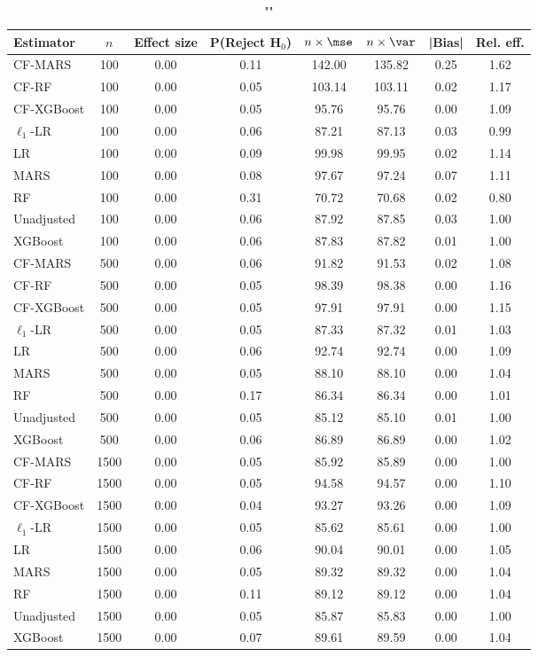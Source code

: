 \begin{table}
\centering
\caption{""}
\begin{tabular}{lccccccc}
\toprule
Estimator & $n$ & Effect size & P(Reject H$_0$) & $n\times\mse$ & $n\times \var$ & |Bias| & Rel. eff.\\ \midrule
CF-MARS & 100 & 0.00 & 0.11 & 142.00 & 135.82 & 0.25 & 1.62 \\ 
CF-RF & 100 & 0.00 & 0.05 & 103.14 & 103.11 & 0.02 & 1.17 \\ 
CF-XGBoost & 100 & 0.00 & 0.05 &  95.76 &  95.76 & 0.00 & 1.09 \\ 
$\ell_1$-LR & 100 & 0.00 & 0.06 &  87.21 &  87.13 & 0.03 & 0.99 \\ 
LR & 100 & 0.00 & 0.09 &  99.98 &  99.95 & 0.02 & 1.14 \\ 
MARS & 100 & 0.00 & 0.08 &  97.67 &  97.24 & 0.07 & 1.11 \\ 
RF & 100 & 0.00 & 0.31 &  70.72 &  70.68 & 0.02 & 0.80 \\ 
Unadjusted & 100 & 0.00 & 0.06 &  87.92 &  87.85 & 0.03 & 1.00 \\ 
XGBoost & 100 & 0.00 & 0.06 &  87.83 &  87.82 & 0.01 & 1.00 \\ \addlinespace 
CF-MARS & 500 & 0.00 & 0.06 &  91.82 &  91.53 & 0.02 & 1.08 \\ 
CF-RF & 500 & 0.00 & 0.05 &  98.39 &  98.38 & 0.00 & 1.16 \\ 
CF-XGBoost & 500 & 0.00 & 0.05 &  97.91 &  97.91 & 0.00 & 1.15 \\ 
$\ell_1$-LR & 500 & 0.00 & 0.05 &  87.33 &  87.32 & 0.01 & 1.03 \\ 
LR & 500 & 0.00 & 0.06 &  92.74 &  92.74 & 0.00 & 1.09 \\ 
MARS & 500 & 0.00 & 0.05 &  88.10 &  88.10 & 0.00 & 1.04 \\ 
RF & 500 & 0.00 & 0.17 &  86.34 &  86.34 & 0.00 & 1.01 \\ 
Unadjusted & 500 & 0.00 & 0.05 &  85.12 &  85.10 & 0.01 & 1.00 \\ 
XGBoost & 500 & 0.00 & 0.06 &  86.89 &  86.89 & 0.00 & 1.02 \\ \addlinespace 
CF-MARS & 1500 & 0.00 & 0.05 &  85.92 &  85.89 & 0.00 & 1.00 \\ 
CF-RF & 1500 & 0.00 & 0.05 &  94.58 &  94.57 & 0.00 & 1.10 \\ 
CF-XGBoost & 1500 & 0.00 & 0.04 &  93.27 &  93.26 & 0.00 & 1.09 \\ 
$\ell_1$-LR & 1500 & 0.00 & 0.05 &  85.62 &  85.61 & 0.00 & 1.00 \\ 
LR & 1500 & 0.00 & 0.06 &  90.04 &  90.01 & 0.00 & 1.05 \\ 
MARS & 1500 & 0.00 & 0.05 &  89.32 &  89.32 & 0.00 & 1.04 \\ 
RF & 1500 & 0.00 & 0.11 &  89.12 &  89.12 & 0.00 & 1.04 \\ 
Unadjusted & 1500 & 0.00 & 0.05 &  85.87 &  85.83 & 0.00 & 1.00 \\ 
XGBoost & 1500 & 0.00 & 0.07 &  89.61 &  89.59 & 0.00 & 1.04 \\
\bottomrule
\end{tabular}
\end{table}

